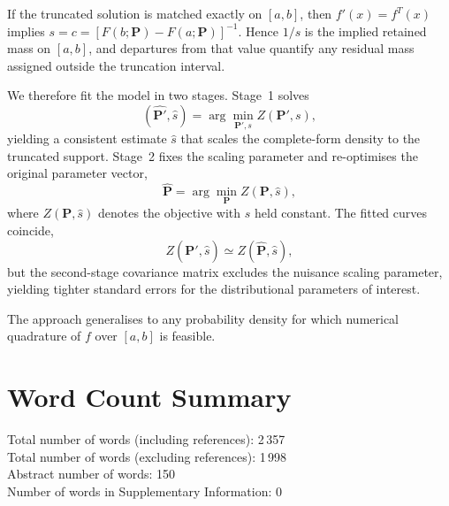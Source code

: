 \documentclass[12pt]{article}
\begin{document}
If the truncated solution is matched exactly on $[a,b]$, then $f'(x)=f^{T}(x)$ implies $s=c=[F(b;\bm{P})-F(a;\bm{P})]^{-1}$. Hence $1/s$ is the implied retained mass on $[a,b]$, and departures from that value quantify any residual mass assigned outside the truncation interval.

We therefore fit the model in two stages. Stage~1 solves
\begin{equation}
  (\widehat{\bm{P}'}, \hat{s}) = \arg\min_{\bm{P}', s} Z(\bm{P}', s),
\end{equation}
yielding a consistent estimate $\hat{s}$ that scales the complete-form density to the truncated support. Stage~2 fixes the scaling parameter and re-optimises the original parameter vector,
\begin{equation}
  \widehat{\bm{P}} = \arg\min_{\bm{P}} Z(\bm{P}, \hat{s}),
\end{equation}
where $Z(\bm{P}, \hat{s})$ denotes the objective with $s$ held constant. The fitted curves coincide,
\begin{equation}
  Z(\widehat{\bm{P}'}, \hat{s}) \simeq Z(\widehat{\bm{P}}, \hat{s}),
\end{equation}
but the second-stage covariance matrix excludes the nuisance scaling parameter, yielding tighter standard errors for the distributional parameters of interest.

The approach generalises to any probability density for which numerical quadrature of $f$ over $[a, b]$ is feasible.


\section*{Word Count Summary}
Total number of words (including references): 2\,357\\
Total number of words (excluding references): 1\,998\\
Abstract number of words: 150\\
Number of words in Supplementary Information: 0



\end{document}
